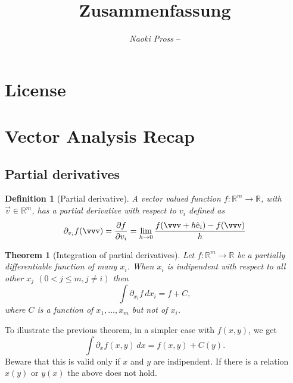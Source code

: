 \documentclass[margin=normal]{tex/hsrzf}
\author{\textsl{Naoki Pross} -- \texttt{\theauthoremail}}
\title{\texttt{\themodule} Zusammenfassung}
\date{\thesemester}
\theoremstyle{elmagzf}
\newtheorem{theorem}{Theorem}
\newtheorem{definition}{Definition}
\begin{document}

\maketitle


\tableofcontents

\section*{License}
\doclicenseThis

\clearpage
\twocolumn
\setcounter{page}{1}

\section{Vector Analysis Recap}

\subsection{Partial derivatives}

\begin{definition}[Partial derivative]
  A vector valued function \(f: \mathbb{R}^m\to\mathbb{R}\), with
  \(\vec{v}\in\mathbb{R}^m\), has a partial derivative with respect to \(v_i\)
  defined as
  \[
    \partial_{v_i} f(\vec{v})
      = \frac{\partial f}{\partial v_i}
      = \lim_{h\to 0} \frac{f(\vec{v} + h\uvec{e}_i) - f(\vec{v})}{h}
  \]
\end{definition}

\begin{theorem}[Integration of partial derivatives]
  Let \(f: \mathbb{R}^m\to\mathbb{R}\) be a partially differentiable function
  of many \(x_i\). When \(x_i\) is \emph{indipendent} with respect to all other
  \(x_j\) \((0 < j \leq m, j \neq i)\) then
  \[
    \int \partial_{x_i} f \,d x_i = f + C,
  \]
  where \(C\) is a function of \(x_1, \ldots, x_m\) but not of \(x_i\).
\end{theorem}

To illustrate the previous theorem, in a simpler case with \(f(x,y)\), we get
\[
  \int \partial_x f(x,y) \,dx = f(x, y) + C(y).
\]
Beware that this is valid only if \(x\) and \(y\) are indipendent.
If there is a relation \(x(y)\) or \(y(x)\) the above does not hold.
\end{document}
